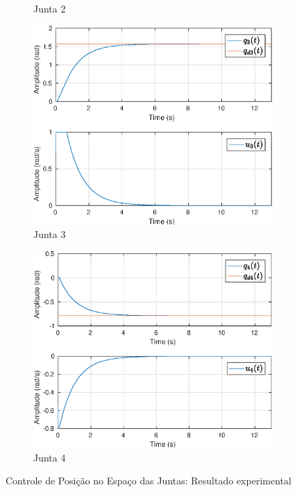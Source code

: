\begin{figure}[H]
\begin{subfigure}{.5\textwidth}
  \caption{Junta 2}
  \label{fig:sub2}
\end{subfigure}
\begin{subfigure}{.5\textwidth}
  \centering
  \includegraphics[width=\linewidth]{./img/joint_test1/q3.eps}
  \caption{Junta 3}
  \label{fig:sub1}
\end{subfigure}%
\begin{subfigure}{.5\textwidth}
  \centering
  \includegraphics[width=\linewidth]{./img/joint_test1/q4.eps}
  \caption{Junta 4}
  \label{fig:sub2}
\end{subfigure}
\caption{Controle de Posição no Espaço das Juntas: Resultado experimental}
\label{fig:test}
\end{figure}


